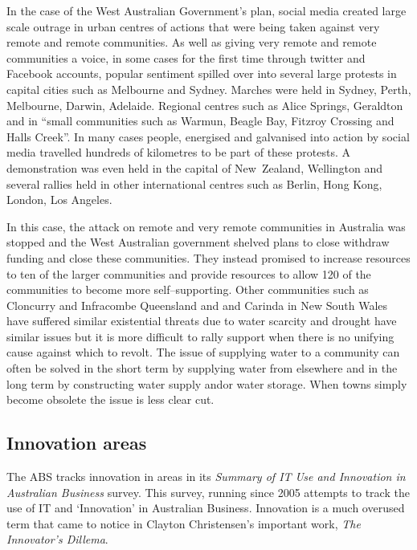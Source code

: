 In the case of the West Australian Government's plan, social media created large scale outrage in urban centres of actions that were being taken against very remote and remote communities. As well as giving very remote and remote communities a voice, in some cases for the first time through twitter and Facebook accounts, popular sentiment spilled over into several large protests in capital cities such as Melbourne and Sydney. Marches were held in Sydney, Perth, Melbourne, Darwin, Adelaide. Regional centres such as Alice Springs,  Geraldton and in ``small communities such as Warmun, Beagle Bay, Fitzroy Crossing and Halls Creek''. In many cases people, energised and galvanised into action by social media travelled hundreds of kilometres to be part of these protests. A demonstration was even held in the capital of New~Zealand, Wellington and several rallies held in other international centres such as Berlin, Hong Kong, London, Los Angeles\cite{RefWorks:302}.

In this case, the attack on remote and very remote communities in Australia was stopped and the West Australian government shelved plans to close withdraw funding and close these communities. They instead promised to increase resources to ten of the larger communities and provide resources to allow 120 of the communities to become more self--supporting\cite{RefWorks:303}. Other communities such as Cloncurry and Infracombe Queensland and and Carinda in New South Wales have suffered similar existential threats due to water scarcity and drought have similar issues but it is more difficult to rally support when there is no unifying cause against which to revolt\cite{RefWorks:304}. The issue of supplying water to a community can often be solved in the short term by supplying water from elsewhere and in the long term by constructing water supply and\/or water storage. When towns simply become obsolete the issue is less clear cut.

\subsection{Innovation areas}
The ABS tracks innovation in areas in its \textit{Summary of IT Use and Innovation in Australian Business} \cite{RefWorks:225} survey. This survey, running since 2005 attempts to track the use of IT and `Innovation' in Australian Business. Innovation is a much overused term that came to notice in Clayton Christensen's important work, \textit{The Innovator's Dillema}\cite{RefWorks:237}.  


